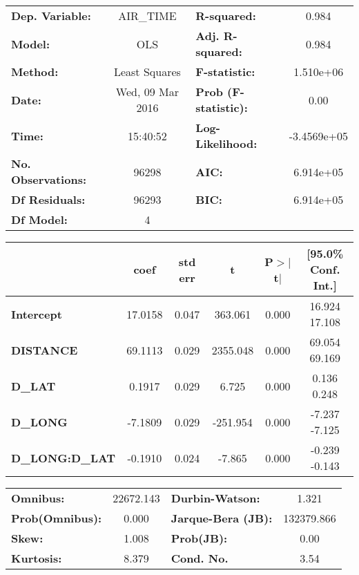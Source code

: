 \begin{center}
\begin{tabular}{lclc}
\toprule
\textbf{Dep. Variable:}    &     AIR_TIME     & \textbf{  R-squared:         } &      0.984   \\
\textbf{Model:}            &       OLS        & \textbf{  Adj. R-squared:    } &      0.984   \\
\textbf{Method:}           &  Least Squares   & \textbf{  F-statistic:       } &  1.510e+06   \\
\textbf{Date:}             & Wed, 09 Mar 2016 & \textbf{  Prob (F-statistic):} &      0.00    \\
\textbf{Time:}             &     15:40:52     & \textbf{  Log-Likelihood:    } & -3.4569e+05  \\
\textbf{No. Observations:} &       96298      & \textbf{  AIC:               } &  6.914e+05   \\
\textbf{Df Residuals:}     &       96293      & \textbf{  BIC:               } &  6.914e+05   \\
\textbf{Df Model:}         &           4      & \textbf{                     } &              \\
\bottomrule
\end{tabular}
\begin{tabular}{lccccc}
                      & \textbf{coef} & \textbf{std err} & \textbf{t} & \textbf{P$>$$|$t$|$} & \textbf{[95.0\% Conf. Int.]}  \\
\midrule
\textbf{Intercept}    &      17.0158  &        0.047     &   363.061  &         0.000        &        16.924    17.108       \\
\textbf{DISTANCE}     &      69.1113  &        0.029     &  2355.048  &         0.000        &        69.054    69.169       \\
\textbf{D_LAT}        &       0.1917  &        0.029     &     6.725  &         0.000        &         0.136     0.248       \\
\textbf{D_LONG}       &      -7.1809  &        0.029     &  -251.954  &         0.000        &        -7.237    -7.125       \\
\textbf{D_LONG:D_LAT} &      -0.1910  &        0.024     &    -7.865  &         0.000        &        -0.239    -0.143       \\
\bottomrule
\end{tabular}
\begin{tabular}{lclc}
\textbf{Omnibus:}       & 22672.143 & \textbf{  Durbin-Watson:     } &     1.321   \\
\textbf{Prob(Omnibus):} &    0.000  & \textbf{  Jarque-Bera (JB):  } & 132379.866  \\
\textbf{Skew:}          &    1.008  & \textbf{  Prob(JB):          } &      0.00   \\
\textbf{Kurtosis:}      &    8.379  & \textbf{  Cond. No.          } &      3.54   \\
\bottomrule
\end{tabular}
\end{center}